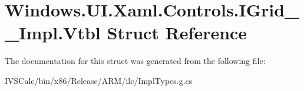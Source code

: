 \hypertarget{struct_windows_1_1_u_i_1_1_xaml_1_1_controls_1_1_i_grid_____impl_1_1_vtbl}{}\section{Windows.\+U\+I.\+Xaml.\+Controls.\+I\+Grid\+\_\+\+\_\+\+Impl.\+Vtbl Struct Reference}
\label{struct_windows_1_1_u_i_1_1_xaml_1_1_controls_1_1_i_grid_____impl_1_1_vtbl}


The documentation for this struct was generated from the following file\+:\begin{DoxyCompactItemize}
\item 
I\+V\+S\+Calc/bin/x86/\+Release/\+A\+R\+M/ilc/Impl\+Types.\+g.\+cs\end{DoxyCompactItemize}
